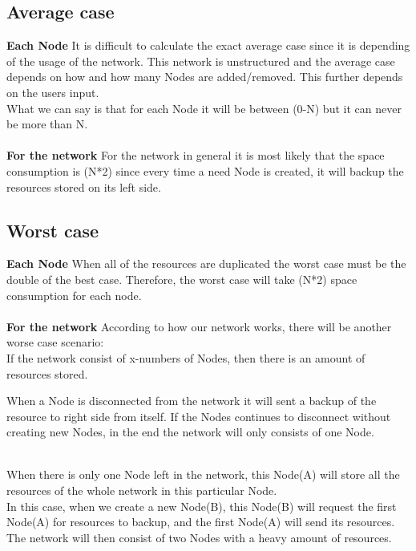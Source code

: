 \subsection{Average case}
\textbf{Each Node}
It is difficult to calculate the exact average case since it is depending of the usage of the network. This network is unstructured and the average case depends on how and how many Nodes are added/removed. This further depends on the users input.\\
What we can say is that for each Node it will be between (0-N) but it can never be more than N. \\\\ \textbf{For the network}
For the network in general it is most likely that the space consumption is (N*2) since every time a need Node is created, it will backup the resources stored on its left side. 

\subsection{Worst case}
\textbf{Each Node}
When all of the resources are duplicated the worst case must be the double of the best case. Therefore, the worst case will take (N*2) space consumption for each node.\\\\ \textbf{For the network}
According to how our network works, there will be another worse case scenario: \\

If the network consist of x-numbers of Nodes, then there is an amount of resources stored. 


When a Node is disconnected from the network it will sent a backup of the resource to right side from itself. If the Nodes continues to disconnect without creating new Nodes, in the end the network will only consists of one Node. \\\\




When there is only one Node left in the network, this Node(A) will store all the resources of the whole network in this particular Node.\\
In this case, when we create a new Node(B), this Node(B) will request the first Node(A) for resources to backup, and the first Node(A) will send its resources. \\ The network will then consist of two Nodes with a heavy amount of resources.\\

